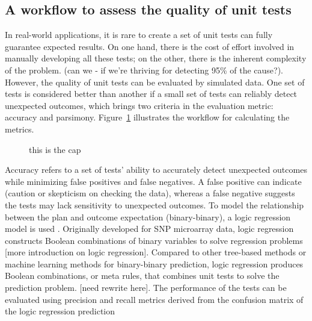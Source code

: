 \documentclass[
]{jds}
\begin{document}
\subsection{A workflow to assess the quality of unit
tests}\label{a-workflow-to-assess-the-quality-of-unit-tests}

In real-world applications, it is rare to create a set of unit tests can
fully guarantee expected results. On one hand, there is the cost of
effort involved in manually developing all these tests; on the other,
there is the inherent complexity of the problem. (can we - if we're
thriving for detecting 95\% of the cause?). However, the quality of unit
tests can be evaluated by simulated data. One set of tests is considered
better than another if a small set of tests can reliably detect
unexpected outcomes, which brings two criteria in the evaluation metric:
accuracy and parsimony. Figure~\ref{fig-metric-calc} illustrates the
workflow for calculating the metrics.

\label{cell-fig-metric-calc}
\begin{figure}[H]


\caption{\label{fig-metric-calc}this is the cap}

\end{figure}%

Accuracy refers to a set of tests' ability to accurately detect
unexpected outcomes while minimizing false positives and false
negatives. A false positive can indicate (caution or skepticism on
checking the data), whereas a false negative suggests the tests may lack
sensitivity to unexpected outcomes. To model the relationship between
the plan and outcome expectation (binary-binary), a logic regression
model is used \citep{ruczinski_logic_2003}. Originally developed for SNP
microarray data, logic regression constructs Boolean combinations of
binary variables to solve regression problems {[}more introduction on
logic regression{]}. Compared to other tree-based methods or machine
learning methods for binary-binary prediction, logic regression produces
Boolean combinations, or meta rules, that combines unit tests to solve
the prediction problem. {[}need rewrite here{]}. The performance of the
tests can be evaluated using precision and recall metrics derived from
the confusion matrix of the logic regression prediction
\end{document}
